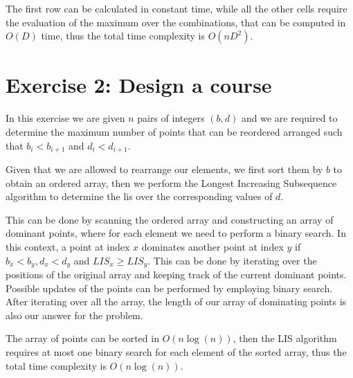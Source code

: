 \documentclass[12pt,a4paper]{article}
\begin{document}
The first row can be calculated in constant time, while all the other cells require the evaluation of the maximum over the combinations, that can be computed in $O(D)$ time, thus the total time complexity is $O(nD^2)$.

\section*{Exercise 2: Design a course}

In this exercise we are given $n$ pairs of integers $(b, d)$ and we are required to determine the maximum number of points that can be reordered arranged such that $b_i < b_{i+1}$ and $d_i < d_{i+1}$.

Given that we are allowed to rearrange our elements, we first sort them by $b$ to obtain an ordered array, then we perform the Longest Increasing Subsequence algorithm to determine the lis over the corresponding values of $d$.

This can be done by scanning the ordered array and constructing an array of dominant points, where for each element we need to perform a binary search.
In this context, a point at index $x$ dominates another point at index $y$ if $b_x < b_y, d_x < d_y$ and $LIS_x \ge LIS_y$. 
This can be done by iterating over the positions of the original array and keeping track of the current dominant points. Possible updates of the points can be performed by employing binary search. After iterating over all the array, the length of our array of dominating points is also our answer for the problem.


The array of points can be sorted in $O(n\log(n))$, then the LIS algorithm requires at most one binary search for each element of the sorted array, thus the total time complexity is $O(n\log(n))$.
\end{document}
